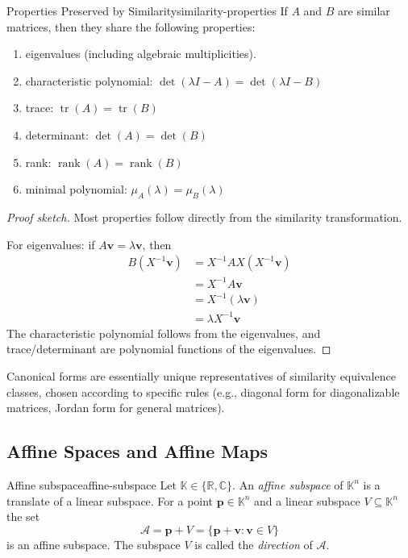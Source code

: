 \documentclass[../../main.tex]{subfiles}
\begin{document}
\begin{theorem}{Properties Preserved by Similarity}{similarity-properties}
    If $A$ and $B$ are similar matrices, then they share the following properties:
    \begin{enumerate}
        \item eigenvalues (including algebraic multiplicities).
        \item characteristic polynomial: $\det(\lambda I - A) = \det(\lambda I - B)$
        \item trace: $\operatorname{tr}(A) = \operatorname{tr}(B)$
        \item determinant: $\det(A) = \det(B)$
        \item rank: $\operatorname{rank}(A) = \operatorname{rank}(B)$
        \item minimal polynomial: $\mu_A(\lambda) = \mu_B(\lambda)$
    \end{enumerate}
\end{theorem}

\begin{proof}[Proof sketch]
    Most properties follow directly from the similarity transformation.

    For eigenvalues: if $A\mathbf{v} = \lambda \mathbf{v}$, then
    \begin{align*}
        B(X^{-1}\mathbf{v}) & = X^{-1} A X(X^{-1}\mathbf{v}) \\
                            & = X^{-1} A \mathbf{v}          \\
                            & = X^{-1} (\lambda \mathbf{v})  \\
                            & = \lambda X^{-1} \mathbf{v}
    \end{align*}
    The characteristic polynomial follows from the eigenvalues, and trace/determinant are polynomial functions of the eigenvalues.
\end{proof}

Canonical forms are essentially unique representatives of similarity equivalence classes, chosen according to specific rules (e.g., diagonal form for diagonalizable matrices, Jordan form for general matrices).

\subsection{Affine Spaces and Affine Maps}
\label{sec:affine-spaces}

\begin{definition}{Affine subspace}{affine-subspace}
    Let $\mathbb{K}\in\{\mathbb{R},\mathbb{C}\}$. An \emph{affine subspace} of $\mathbb{K}^n$ is a translate of a linear subspace.
    For a point $\mathbf{p}\in\mathbb{K}^n$ and a linear subspace $V\subseteq\mathbb{K}^n$ the set
    \[
        \mathcal{A}=\mathbf{p}+V=\{\mathbf{p}+\mathbf{v}:\mathbf{v}\in V\}
    \]
    is an affine subspace. The subspace $V$ is called the \emph{direction} of $\mathcal{A}$.
\end{definition}
\end{document}
